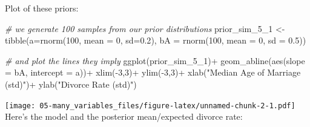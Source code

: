 \documentclass[
]{book}
\newenvironment{Shaded}{\begin{snugshade}}{\end{snugshade}}
\newcommand{\AttributeTok}[1]{\textcolor[rgb]{0.77,0.63,0.00}{#1}}
\newcommand{\CommentTok}[1]{\textcolor[rgb]{0.56,0.35,0.01}{\textit{#1}}}
\newcommand{\DecValTok}[1]{\textcolor[rgb]{0.00,0.00,0.81}{#1}}
\newcommand{\FloatTok}[1]{\textcolor[rgb]{0.00,0.00,0.81}{#1}}
\newcommand{\FunctionTok}[1]{\textcolor[rgb]{0.00,0.00,0.00}{#1}}
\newcommand{\NormalTok}[1]{#1}
\newcommand{\OtherTok}[1]{\textcolor[rgb]{0.56,0.35,0.01}{#1}}
\newcommand{\SpecialCharTok}[1]{\textcolor[rgb]{0.00,0.00,0.00}{#1}}
\newcommand{\StringTok}[1]{\textcolor[rgb]{0.31,0.60,0.02}{#1}}
\begin{document}
Plot of these priors:

\begin{Shaded}
\begin{Highlighting}[]
\CommentTok{\# we generate 100 samples from our prior distributions}
\NormalTok{prior\_sim\_5\_1 }\OtherTok{\textless{}{-}} \FunctionTok{tibble}\NormalTok{(}\AttributeTok{a=}\FunctionTok{rnorm}\NormalTok{(}\DecValTok{100}\NormalTok{, }\AttributeTok{mean =} \DecValTok{0}\NormalTok{, }\AttributeTok{sd=}\FloatTok{0.2}\NormalTok{),}
                    \AttributeTok{bA =} \FunctionTok{rnorm}\NormalTok{(}\DecValTok{100}\NormalTok{, }\AttributeTok{mean =} \DecValTok{0}\NormalTok{, }\AttributeTok{sd =} \FloatTok{0.5}\NormalTok{))}

\CommentTok{\# and plot the lines they imply}
\FunctionTok{ggplot}\NormalTok{(prior\_sim\_5\_1)}\SpecialCharTok{+}
  \FunctionTok{geom\_abline}\NormalTok{(}\FunctionTok{aes}\NormalTok{(}\AttributeTok{slope =}\NormalTok{ bA,}
                  \AttributeTok{intercept =}\NormalTok{ a))}\SpecialCharTok{+}
  \FunctionTok{xlim}\NormalTok{(}\SpecialCharTok{{-}}\DecValTok{3}\NormalTok{,}\DecValTok{3}\NormalTok{)}\SpecialCharTok{+}
  \FunctionTok{ylim}\NormalTok{(}\SpecialCharTok{{-}}\DecValTok{3}\NormalTok{,}\DecValTok{3}\NormalTok{)}\SpecialCharTok{+}
  \FunctionTok{xlab}\NormalTok{(}\StringTok{"Median Age of Marriage (std)"}\NormalTok{)}\SpecialCharTok{+}
  \FunctionTok{ylab}\NormalTok{(}\StringTok{"Divorce Rate (std)"}\NormalTok{)}
\end{Highlighting}
\end{Shaded}

\texttt{[image: 05-many\_variables\_files/figure-latex/unnamed-chunk-2-1.pdf]}
Here's the model and the posterior mean/expected divorce rate:
\end{document}
